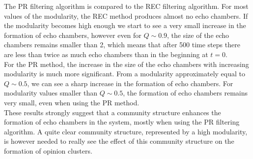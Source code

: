 \documentclass[11 pt , letterpaper , twoside , openright]{book}
\begin{document}
\newline
The PR filtering algorithm is compared to the REC filtering algorithm. For most values of the modularity, the REC method produces almost no echo chambers. If the modularity becomes high enough we start to see a very small increase in the formation of echo chambers, however even for $Q \sim 0.9$, the size of the echo chambers remains smaller than 2, which means that after 500 time steps there are less than twice as much echo chambers than in the beginning at $t=0$.\\
For the PR method, the increase in the size of the echo chambers with increasing modularity is much more significant. From a modularity approximately equal to $Q \sim 0.5$, we can see a sharp increase in the formation of echo chambers. For modularity values smaller than $Q \sim 0.5$, the formation of echo chambers remains very small, even when using the PR method.\\
These results strongly suggest that a community structure enhances the formation of echo chambers in the system, mostly when using the PR filtering algorithm. A quite clear community structure, represented by a high modularity, is however needed to really see the effect of this community structure on the formation of opinion clusters.
\newpage
\end{document}
